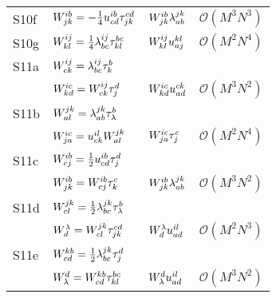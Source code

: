 \begin{center}
\begin{longtable}{@{}llll@{}}
                S10f
                & $W^{ib}_{jk} = -\frac{1}{4} u^{ib}_{cd} \tau^{cd}_{jk}$
                & $W^{ib}_{jk} \lambda^{jk}_{ab}$
                & $\mathcal{O}(M^3 N^3)$
                \\

                S10g
                & $W^{ij}_{kl} = \frac{1}{4} \lambda^{ij}_{bc} \tau^{bc}_{kl}$
                & $W^{ij}_{kl} u^{kl}_{aj}$
                & $\mathcal{O}(M^2 N^4)$
                \\

                S11a
                & $W^{ij}_{ck} = \lambda^{ij}_{bc} \tau^{b}_{k}$
                \\
                & $W^{ic}_{kd} = W^{ij}_{ck} \tau^{d}_{j}$
                & $W^{ic}_{kd} u^{ck}_{ad}$
                & $\mathcal{O}(M^3 N^2)$
                \\

                S11b
                & $W^{jk}_{al} = \lambda^{jk}_{ab} \tau^{b}_{\lambda}$
                \\
                & $W^{ic}_{ja} = u^{il}_{ck} W^{jk}_{al}$
                & $W^{ic}_{ja} \tau^{c}_{j}$
                & $\mathcal{O}(M^2 N^4)$
                \\

                S11c
                & $W^{ib}_{cj} = \frac{1}{2} u^{ib}_{cd} \tau^{d}_{j}$
                \\
                & $W^{ib}_{jk} = W^{ib}_{cj} \tau^{c}_{k}$
                & $W^{ib}_{jk} \lambda^{jk}_{ab}$
                & $\mathcal{O}(M^3 N^2)$
                \\

                S11d
                & $W^{jk}_{cl} = \frac{1}{2} \lambda^{jk}_{bc} \tau^{b}_{\lambda}$
                \\
                & $W^{\lambda}_{d} = W^{jk}_{cl} \tau^{cd}_{jk}$
                & $W^{\lambda}_{d} u^{il}_{ad}$
                & $\mathcal{O}(M^2 N^3)$
                \\

                S11e
                & $W^{kb}_{cd} = \frac{1}{2} \lambda^{jk}_{bc} \tau^{d}_{j}$
                \\
                & $W^{d}_{\lambda} = W^{kb}_{cd} \tau^{bc}_{kl}$
                & $W^{d}_{\lambda} u^{il}_{ad}$
                & $\mathcal{O}(M^3 N^2)$
                \\


\end{longtable}
\end{center}

